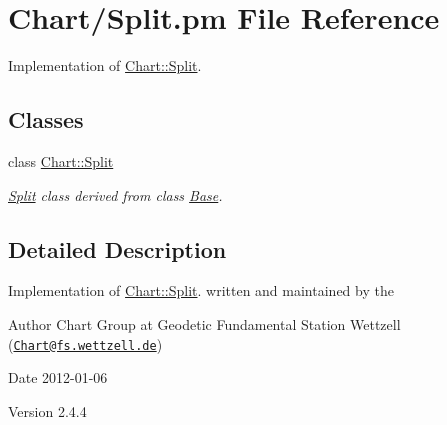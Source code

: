 \hypertarget{Split_8pm}{
\section{Chart/Split.pm File Reference}
\label{Split_8pm}
}


Implementation of \hyperlink{classChart_1_1Split}{Chart::Split}.  


\subsection*{Classes}
\begin{DoxyCompactItemize}
\item 
class \hyperlink{classChart_1_1Split}{Chart::Split}
\begin{DoxyCompactList}\small\item\em \hyperlink{classChart_1_1Split}{Split} class derived from class \hyperlink{classChart_1_1Base}{Base}. \item\end{DoxyCompactList}\end{DoxyCompactItemize}


\subsection{Detailed Description}
Implementation of \hyperlink{classChart_1_1Split}{Chart::Split}. written and maintained by the \begin{DoxyAuthor}{Author}
Chart Group at Geodetic Fundamental Station Wettzell (\href{mailto:Chart@fs.wettzell.de}{\tt Chart@fs.wettzell.de}) 
\end{DoxyAuthor}
\begin{DoxyDate}{Date}
2012-\/01-\/06 
\end{DoxyDate}
\begin{DoxyVersion}{Version}
2.4.4 
\end{DoxyVersion}
